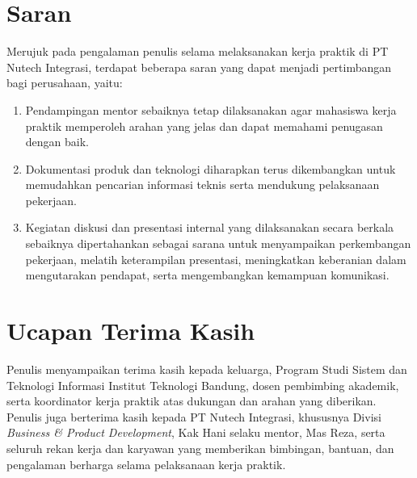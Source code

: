\section{Saran}
Merujuk pada pengalaman penulis selama melaksanakan kerja praktik di PT Nutech Integrasi, terdapat beberapa saran yang dapat menjadi pertimbangan bagi perusahaan, yaitu:

\begin{enumerate}
    \item Pendampingan mentor sebaiknya tetap dilaksanakan agar mahasiswa kerja praktik memperoleh arahan yang jelas dan dapat memahami penugasan dengan baik.
    \item Dokumentasi produk dan teknologi diharapkan terus dikembangkan untuk memudahkan pencarian informasi teknis serta mendukung pelaksanaan pekerjaan.
    \item Kegiatan diskusi dan presentasi internal yang dilaksanakan secara berkala sebaiknya dipertahankan sebagai sarana untuk menyampaikan perkembangan pekerjaan, melatih keterampilan presentasi, meningkatkan keberanian dalam mengutarakan pendapat, serta mengembangkan kemampuan komunikasi.
\end{enumerate}

\section{Ucapan Terima Kasih}
Penulis menyampaikan terima kasih kepada keluarga, Program Studi Sistem dan Teknologi Informasi Institut Teknologi Bandung, dosen pembimbing akademik, serta koordinator kerja praktik atas dukungan dan arahan yang diberikan. Penulis juga berterima kasih kepada PT Nutech Integrasi, khususnya Divisi \textit{Business \& Product Development}, Kak Hani selaku mentor, Mas Reza, serta seluruh rekan kerja dan karyawan yang memberikan bimbingan, bantuan, dan pengalaman berharga selama pelaksanaan kerja praktik.
